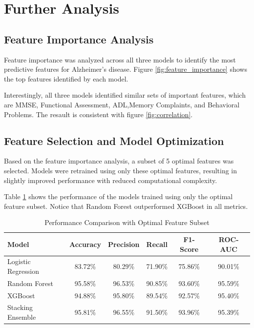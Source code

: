\documentclass[12pt]{article}
\begin{document}
\section{Further Analysis}
\label{sec:further}

\subsection{Feature Importance Analysis}
Feature importance was analyzed across all three models to identify the most predictive features for Alzheimer's disease. Figure \ref{fig:feature_importance} shows the top features identified by each model.



Interestingly, all three models identified similar sets of important features, which are MMSE, Functional Assessment, ADL,Memory Complaints, and Behavioral Problems. The resault is consistent with figure \ref{fig:correlation}.

\subsection{Feature Selection and Model Optimization}
Based on the feature importance analysis, a subset of 5 optimal features was selected. Models were retrained using only these optimal features, resulting in slightly improved performance with reduced computational complexity.

Table \ref{tab:optimal_model_comparison} shows the performance of the models trained using only the optimal feature subset. Notice that Random Forest outperformed XGBoost in all metrics.

\begin{table}[H]
    \centering
    \caption{Performance Comparison with Optimal Feature Subset}
    \label{tab:optimal_model_comparison}
    \begin{tabular}{lccccc}
        \toprule
        \textbf{Model} & \textbf{Accuracy} & \textbf{Precision} & \textbf{Recall} & \textbf{F1-Score} & \textbf{ROC-AUC} \\
        \midrule
        Logistic Regression & 83.72\% & 80.29\% & 71.90\% & 75.86\% & 90.01\% \\
        Random Forest & 95.58\% & 96.53\% & 90.85\% & 93.60\% & 95.59\% \\
        XGBoost & 94.88\% & 95.80\% & 89.54\% & 92.57\% & 95.40\% \\
        Stacking Ensemble & 95.81\% & 96.55\% & 91.50\% & 93.96\% & 95.39\% \\
        \bottomrule
    \end{tabular}
\end{table}
\end{document}
